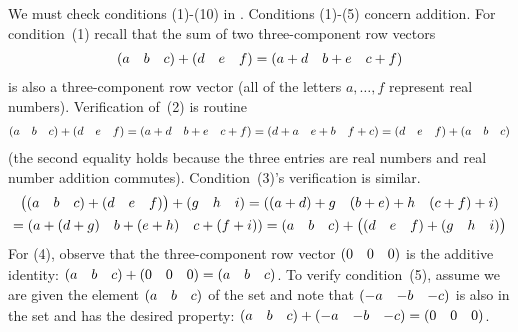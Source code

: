 \begin{exercises}
\begin{answer}
\begin{exparts}
          We must check conditions (1)-(10) in .
          Conditions (1)-(5) concern addition.
          For condition~(1) recall that the sum of two three-component 
          row vectors 
          \begin{equation*}
            (\begin{matrix} a  &b  &c \end{matrix})
            +(\begin{matrix} d  &e  &f \end{matrix})
            =(\begin{matrix} a+d  &b+e  &c+f \end{matrix})
          \end{equation*}
          is also a three-component row vector
         (all of the letters $a,\ldots,f$ represent real numbers).
         Verification of~(2) is routine
          \begin{equation*}
            (\begin{matrix} a  &b  &c \end{matrix})
            +(\begin{matrix} d  &e  &f \end{matrix})
            =(\begin{matrix} a+d  &b+e  &c+f \end{matrix})
            =(\begin{matrix} d+a  &e+b  &f+c \end{matrix})
            =(\begin{matrix} d  &e  &f \end{matrix})
            +(\begin{matrix} a  &b  &c \end{matrix})
          \end{equation*}
          (the second equality holds because the three entries are real
          numbers and real number addition commutes).
         Condition~(3)'s verification is similar.
          \begin{multline*}
            \big((\begin{matrix} a  &b  &c \end{matrix})
              +(\begin{matrix} d  &e  &f \end{matrix})
            \big)
            +(\begin{matrix} g  &h  &i \end{matrix})
            =(\begin{matrix} (a+d)+g  &(b+e)+h  &(c+f)+i \end{matrix})    \\
            =(\begin{matrix} a+(d+g)  &b+(e+h)  &c+(f+i) \end{matrix})
            =(\begin{matrix} a  &b  &c \end{matrix})
            +\big((\begin{matrix} d  &e  &f \end{matrix})
               +(\begin{matrix} g  &h  &i \end{matrix})
             \big) 
          \end{multline*}
          For (4), observe that the three-component row vector
          $(\begin{matrix} 0  &0  &0 \end{matrix})$ is the additive identity:
          $(\begin{matrix} a  &b  &c \end{matrix})+(\begin{matrix} 0  &0  &0 \end{matrix})=(\begin{matrix} a  &b  &c \end{matrix})$.
          To verify condition~(5), assume we are given the 
          element $(\begin{matrix} a  &b  &c \end{matrix})$ of the set and note that
          $(\begin{matrix} -a  &-b  &-c \end{matrix})$ is also in the set and has the
          desired property: 
          $(\begin{matrix} a  &b  &c \end{matrix})+(\begin{matrix} -a  &-b  &-c \end{matrix})=(\begin{matrix} 0  &0  &0 \end{matrix})$.


\end{exparts}
\end{answer}
\end{exercises}
